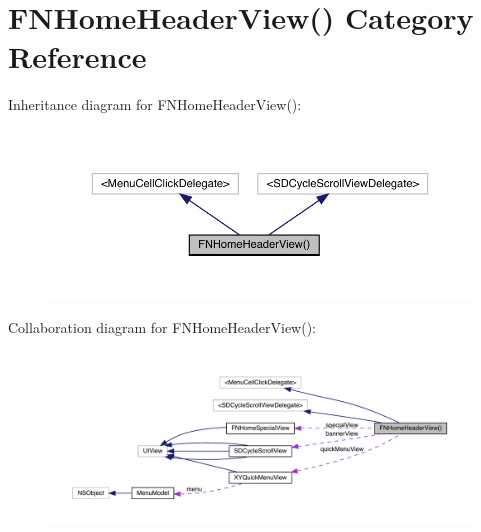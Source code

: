 \hypertarget{category_f_n_home_header_view_07_08}{}\section{F\+N\+Home\+Header\+View() Category Reference}
\label{category_f_n_home_header_view_07_08}


Inheritance diagram for F\+N\+Home\+Header\+View()\+:\nopagebreak
\begin{figure}[H]
\begin{center}
\leavevmode
\includegraphics[width=350pt]{category_f_n_home_header_view_07_08__inherit__graph}
\end{center}
\end{figure}


Collaboration diagram for F\+N\+Home\+Header\+View()\+:\nopagebreak
\begin{figure}[H]
\begin{center}
\leavevmode
\includegraphics[width=350pt]{category_f_n_home_header_view_07_08__coll__graph}
\end{center}
\end{figure}
